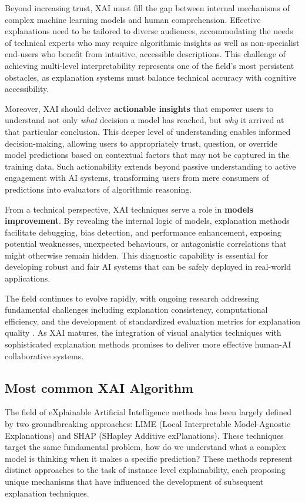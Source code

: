 Beyond increasing trust, XAI must fill the gap between internal mechanisms of complex machine learning models and human comprehension. Effective explanations need to be tailored to diverse audiences, accommodating the needs of technical experts who may require algorithmic insights as well as non-specialist end-users who benefit from intuitive, accessible descriptions. This challenge of achieving multi-level interpretability represents one of the field's most persistent obstacles, as explanation systems must balance technical accuracy with cognitive accessibility.

Moreover, XAI should deliver \textbf{actionable insights} that empower users to understand not only \textit{what} decision a model has reached, but \textit{why} it arrived at that particular conclusion. This deeper level of understanding enables informed decision-making, allowing users to appropriately trust, question, or override model predictions based on contextual factors that may not be captured in the training data. Such actionability extends beyond passive understanding to active engagement with AI systems, transforming users from mere consumers of predictions into evaluators of algorithmic reasoning.

From a technical perspective, XAI techniques serve a role in \textbf{models improvement}. By revealing the internal logic of models, explanation methods facilitate debugging, bias detection, and performance enhancement, exposing potential weaknesses, unexpected behaviours, or antagonistic correlations that might otherwise remain hidden. This diagnostic capability is essential for developing robust and fair AI systems that can be safely deployed in real-world applications.

The field continues to evolve rapidly, with ongoing research addressing fundamental challenges including explanation consistency, computational efficiency, and the development of standardized evaluation metrics for explanation quality \cite{bodria2023benchmarking}. As XAI matures, the integration of visual analytics techniques with sophisticated explanation methods promises to deliver more effective human-AI collaborative systems.

\subsection{Most common XAI Algorithm}

The field of eXplainable Artificial Intelligence methods has been largely defined by two groundbreaking approaches: LIME (Local Interpretable Model-Agnostic Explanations) and SHAP (SHapley Additive exPlanations). These techniques target the same fundamental problem, how do we understand what a complex model is thinking when it makes a specific prediction? These methods represent distinct approaches to the task of instance level explainability, each proposing unique mechanisms that have influenced the development of subsequent explanation techniques.

